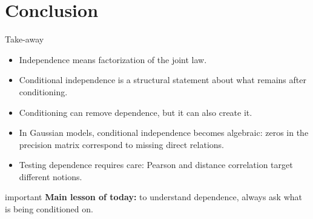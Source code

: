 \documentclass[dvipsnames,aspectratio=169,handout]{beamer}
\begin{document}
%
%
%


\section{Conclusion}

\begin{frame}{Take-away}
\begin{itemize}
    \item Independence means factorization of the joint law.
    \item Conditional independence is a structural statement about what remains after conditioning.
    \item Conditioning can remove dependence, but it can also create it.
    \item In Gaussian models, conditional independence becomes algebraic:
    zeros in the precision matrix correspond to missing direct relations.
    \item Testing dependence requires care:
    Pearson and distance correlation target different notions.
\end{itemize}

\vspace{2mm}

\begin{beamercolorbox}[wd=\textwidth,sep=8pt,center,rounded=true,shadow=true]{important}
\textbf{Main lesson of today:}
to understand dependence, always ask what is being conditioned on.
\end{beamercolorbox}
\end{frame}
\end{document}
